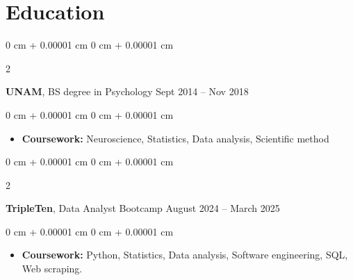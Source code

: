 \documentclass[10pt, a4paper]{article}
\newenvironment{highlights}{
    \begin{itemize}[
        topsep=0.10 cm,
        parsep=0.10 cm,
        partopsep=0pt,
        itemsep=0pt,
        leftmargin=0 cm + 10pt
    ]
}{
    \end{itemize}
} %
\newenvironment{onecolentry}{
    \begin{adjustwidth}{
        0 cm + 0.00001 cm
    }{
        0 cm + 0.00001 cm
    }
}{
    \end{adjustwidth}
} %
\newenvironment{twocolentry}[2][]{
    \onecolentry
    \def\secondColumn{#2}
    \setcolumnwidth{\fill, 4.5 cm}
    \begin{paracol}{2}
}{
    \switchcolumn \raggedleft \secondColumn
    \end{paracol}
    \endonecolentry
} %
\begin{document}
    \section{Education}
        \begin{samepage}
        \begin{twocolentry}{      Sept 2014 – Nov 2018 }
            \textbf{UNAM}, BS degree in Psychology  \end{twocolentry}
                \begin{onecolentry}
            \begin{highlights}
                \item \textbf{Coursework:} Neuroscience, Statistics, Data analysis, Scientific method
            \end{highlights}
        \end{onecolentry}\textbf{}
        \vspace{0.10 cm}


        \begin{twocolentry}{    August 2024 – March 2025   }
            \textbf{TripleTen}, Data Analyst Bootcamp\end{twocolentry}
        \begin{onecolentry}
            \begin{highlights}
                \item \textbf{Coursework:} Python, Statistics, Data analysis, Software engineering, SQL, Web scraping.
            \end{highlights}
        \end{onecolentry}\textbf{}
        \vspace{0.10 cm}
        \end{samepage} 

        
\end{document}
